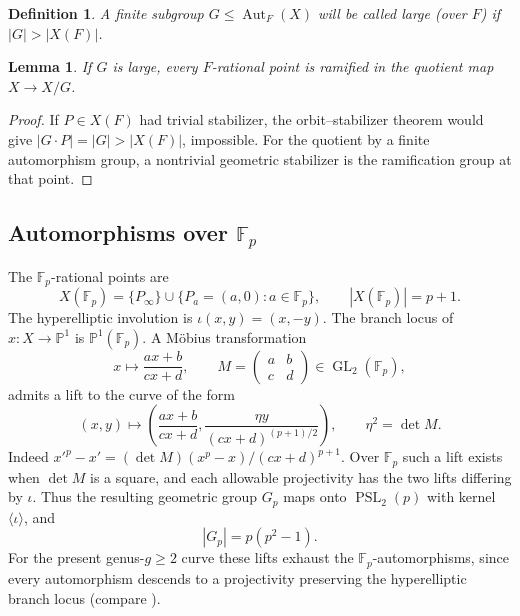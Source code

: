 \documentclass[12pt]{article}
\newtheorem{lemma}[theorem]{Lemma}
\newtheorem{definition}[theorem]{Definition}
\numberwithin{equation}{section}
\newcommand{\F}{\mathbb{F}}
\newcommand{\PP}{\mathbb{P}}
\newcommand{\Aut}{\operatorname{Aut}}
\newcommand{\PSL}{\operatorname{PSL}}
\begin{document}
\begin{definition}
A finite subgroup $G\leq\Aut_F(X)$ will be called \emph{large}
(over $F$) if $|G|>|X(F)|$.
\end{definition}
\begin{lemma}\label{lem:large}
If $G$ is large, every $F$-rational point is ramified in
the quotient map $X\to X/G$.
\end{lemma}
\begin{proof}
If $P\in X(F)$ had trivial stabilizer, the orbit--stabilizer theorem
would give $|G\cdot P|=|G|>|X(F)|$, impossible.
For the quotient by a finite automorphism group, a nontrivial
geometric stabilizer is the ramification group at that point.
\end{proof}

\subsection{Automorphisms over $\F_p$}\label{subsec:fp}
The $\F_p$-rational points are
\begin{equation}\label{eq:fp-points}
X(\F_p)=\{P_\infty\}\cup\{P_a=(a,0):a\in\F_p\},
\qquad |X(\F_p)|=p+1.
\end{equation}
The hyperelliptic involution is $\iota(x,y)=(x,-y)$.
The branch locus of $x:X\to\PP^1$ is $\PP^1(\F_p)$.
A M\"obius transformation
\[
x\longmapsto\frac{ax+b}{cx+d},\qquad
M=\begin{pmatrix}a&b\\c&d\end{pmatrix}\in\operatorname{GL}_2(\F_p),
\]
admits a lift to the curve of the form
\begin{equation}\label{eq:lift}
(x,y)\longmapsto
\left(\frac{ax+b}{cx+d},\frac{\eta y}{(cx+d)^{(p+1)/2}}\right),
\qquad \eta^2=\det M.
\end{equation}
Indeed $x'^p-x'=(\det M)(x^p-x)/(cx+d)^{p+1}$.
Over $\F_p$ such a lift exists when $\det M$ is a square,
and each allowable projectivity has the two lifts differing by $\iota$.
Thus the resulting geometric group $G_p$ maps onto
$\PSL_2(p)$ with kernel $\langle\iota\rangle$, and
\begin{equation}\label{eq:gp-order}
|G_p|=p(p^2-1).
\end{equation}
For the present genus-$g\geq2$ curve these lifts exhaust the
$\F_p$-automorphisms, since every automorphism descends to a
projectivity preserving the hyperelliptic branch locus
(compare \cite{G}).
\end{document}
